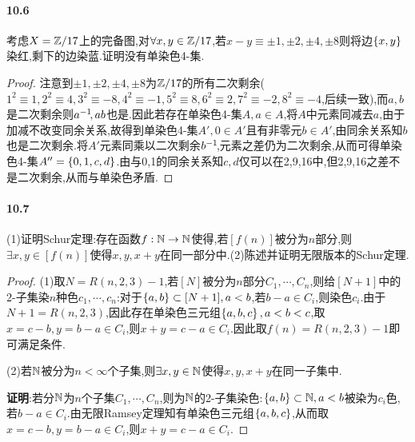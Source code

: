 \documentclass{article}
\begin{document}
\paragraph{10.6}考虑$X=\mathbb{Z}/17$上的完备图,对$\forall x,y\in \mathbb{Z}/17$,若$x-y\equiv \pm 1, \pm 2, \pm 4,\pm 8$则将边$\left\{x,y\right\}$染红,剩下的边染蓝.证明没有单染色4-集.%
\begin{proof}
    注意到$\pm 1, \pm 2, \pm 4,\pm 8$为$\mathbb{Z}/17$的所有二次剩余($1^2\equiv 1, 2^2\equiv 4, 3^2\equiv -8, 4^2\equiv -1, 5^2\equiv 8, 6^2\equiv 2, 7^2\equiv -2, 8^2\equiv -4$,后续一致),而$a,b$是二次剩余则$a^{-1}\!,ab$也是.因此若存在单染色4-集$A, a\in A$,将$A$中元素同减去$a$,由于加减不改变同余关系,故得到单染色4-集$A', 0\in A'$且有非零元$b\in A'$,由同余关系知$b$也是二次剩余.将$A'$元素同乘以二次剩余$b^{-1}\!$,元素之差仍为二次剩余,从而可得单染色4-集$A''=\left\{0,1,c,d\right\}$.由与0,1的同余关系知$c,d$仅可以在2,9,16中,但2,9,16之差不是二次剩余,从而与单染色矛盾.
\end{proof}

\paragraph{10.7}(1)证明Schur定理:存在函数$f:\mathbb{N}\to\mathbb{N}$使得,若$[f(n)]$被分为$n$部分,则$\exists x,y\in [f(n)]$使得$x,y,x+y$在同一部分中.(2)陈述并证明无限版本的Schur定理.%
\begin{proof}
    (1)取$N=R(n,2,3)-1$,若$[N]$被分为$n$部分$C_1,\cdots,C_n$,则给$[N+1]$中的2-子集染$n$种色$c_1,\cdots,c_n$:对于$\left\{a,b\right\}\subset[N+1],a<b$,若$b-a\in C_i$,则染色$c_i$.由于$N+1=R(n,2,3)$,因此存在单染色三元组$\left\{a,b,c\right\},a<b<c$,取$x=c-b,y=b-a\in C_i$,则$x+y=c-a\in C_i$.因此取$f(n)=R(n,2,3)-1$即可满足条件.

    (2)若$\mathbb{N}$被分为$n<\infty$个子集,则$\exists x,y\in \mathbb{N}$使得$x,y,x+y$在同一子集中.

    \textbf{证明}:若分$\mathbb{N}$为$n$个子集$C_1,\cdots,C_n$,则为$\mathbb{N}$的2-子集染色:$\left\{a,b\right\}\subset \mathbb{N}, a<b$被染为$c_i$色,若$b-a\in C_i$.由无限Ramsey定理知有单染色三元组$\left\{a,b,c\right\}$,从而取$x=c-b,y=b-a\in C_i$,则$x+y=c-a\in C_i$.
\end{proof}
\end{document}
